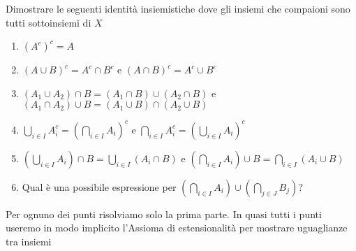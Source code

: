 \begin{es}
  Dimostrare le seguenti identità insiemistiche dove gli insiemi che compaioni sono tutti sottoinsiemi di $ X $
  \begin{enumerate}
  \item $ (A^c)^c = A $
  \item $ (A \cup B)^c = A^c \cap B^c $ e $ (A \cap B)^c = A^c \cup B^c $
  \item $ (A_1 \cup A_2) \cap B = (A_1 \cap B) \cup (A_2 \cap B) $ e $ (A_1 \cap A_2) \cup B = (A_1 \cup B) \cap (A_2 \cup B) $
  \item $ \bigcup_{i \in I} A_i ^c = \left (\bigcap_{i \in I} A_i \right )^c $ e $ \bigcap_{i \in I} A_i ^c = \left (\bigcup_{i \in I} A_i \right )^c $
  \item $ \left (\bigcup_{i \in I} A_i \right ) \cap B = \bigcup_{i \in I} (A_i \cap B) $ e $ \left (\bigcap_{i \in I} A_i \right ) \cup B = \bigcap_{i \in I} (A_i \cup B) $
  \item Qual è una possibile espressione per $ \left (\bigcap_{i \in I} A_i \right ) \cup \left (\bigcap_{j \in J} B_j \right ) $?
  \end{enumerate}
\end{es}
Per ognuno dei punti risolviamo solo  la prima parte. In quasi tutti i punti useremo in modo implicito l'Assioma di estensionalità per mostrare uguaglianze tra insiemi
